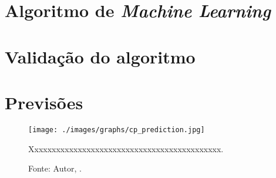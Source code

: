 \lipsum[100]



\section{Algoritmo de \textit{Machine Learning}}



\lipsum[100]



\section{Validação do algoritmo}



\lipsum[100]



\section{Previsões}



\lipsum[100]




\begin{figure}[H]
    \centering
    \texttt{[image: ./images/graphs/cp\_prediction.jpg]}
    \caption{Xxxxxxxxxxxxxxxxxxxxxxxxxxxxxxxxxxxxxxxxxxxx.}
    \label{fig:cp_prediction.jpg}
    \caption*{Fonte: Autor, \imprimirdata.}
\end{figure}



